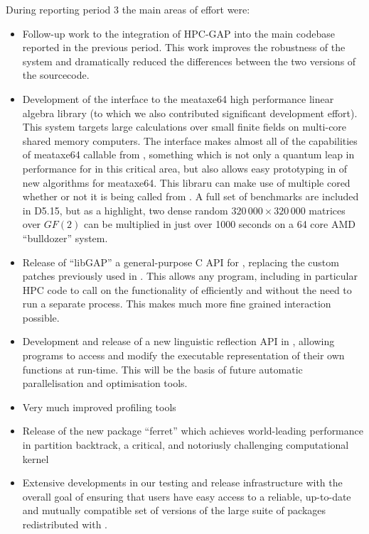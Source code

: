 During reporting period 3 the main areas of effort were:
\begin{itemize}
\item Follow-up work to the integration of HPC-GAP into the main codebase reported in
  the previous period. This work improves the robustness of the system and dramatically reduced the
  differences between the two versions of the sourcecode.
\item
  Development of the \GAP interface to the meataxe64 high performance linear algebra library (to which
  we also contributed significant development effort). This system targets large calculations over
  small finite fields on multi-core shared memory computers. The interface makes almost all of the
  capabilities of meataxe64 callable from \GAP, something which is not only a quantum leap in
  performance for \GAP in this critical area, but also allows easy prototyping in \GAP of new
  algorithms for meataxe64.  This libraru can make use of multiple cored whether or not it is being
  called from \HPCGAP. A full set of benchmarks are included in D5.15, but as a highlight, two
  dense random $320\,000\times 320\,000$ matrices over $GF(2)$ can be multiplied in just over 1000
  seconds on a 64 core AMD ``bulldozer'' system.
  \item Release of ``libGAP'' a general-purpose C API for \GAP, replacing the custom patches
    previously used in \Sage. This allows any program, including in particular HPC code to call on the
    functionality of \GAP efficiently and without the need to run a separate \GAP process. This makes
    much more fine grained interaction possible.
  \item Development and release of a new linguistic reflection API in \GAP, allowing \GAP programs to
    access and modify the executable representation of their own functions at run-time. This will be
    the basis of future automatic parallelisation and optimisation tools.
  \item Very much improved profiling tools
  \item Release of the new package ``ferret'' which achieves world-leading performance in partition
    backtrack, a critical, and notoriusly challenging computational kernel
  \item Extensive developments in our testing and release infrastructure with the overall goal of
    ensuring that \GAP users have easy access to a reliable, up-to-date and mutually compatible set of
    versions of the large suite of packages redistributed with \GAP.
\end{itemize}


